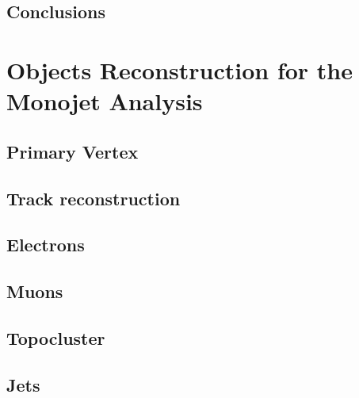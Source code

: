 \documentclass[10pt,twoside,cucitura,classica,openany]{toptesi}
\begin{document}


\section{Conclusions}
\label{sec:conclusions}



\chapter{Objects Reconstruction for the Monojet Analysis}
\label{cha:phys-objects-reconst}



\section{Primary Vertex}
\label{sec:primary-vertex}



\section{Track reconstruction}
\label{sec:track-reconstruction}



\section{Electrons}
\label{sec:electrons}



\section{Muons}
\label{sec:muons}



\section{Topocluster}
\label{sec:topocluster}



\section{Jets}
\label{sec:jets}
\end{document}
